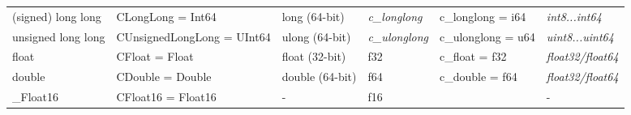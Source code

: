 \begin{table}[]
\begin{adjustwidth}{-3cm}{}
\begin{tabular}{
>{\columncolor[HTML]{D9D9D9}}l lllll}
(signed) long long                                                        & CLongLong = Int64                                                       &    long  (64-bit)                                                                        & \cellcolor[HTML]{CFE2F3}\textit{c\_longlong}                                 & c\_longlong = i64                                                                                                                                                    & \cellcolor[HTML]{CFE2F3}\textit{int8...int64}                         \\
unsigned long long                                                        & CUnsignedLongLong = UInt64                                              &    ulong (64-bit)                                                                               & \cellcolor[HTML]{CFE2F3}\textit{c\_ulonglong}                                & c\_ulonglong = u64                                                                                                                                                   & \cellcolor[HTML]{CFE2F3}\textit{uint8...uint64}                       \\
float                                                                     & CFloat = Float                                                          &    float (32-bit)                                                                                    & f32                                                                 & c\_float = f32                                                                                                                                                                & \cellcolor[HTML]{CFE2F3}\textit{float32/float64}                      \\
double                                                                    & CDouble = Double                                                        &    double (64-bit)                                                                       & f64                                                                 & c\_double = f64                                                                                                                                                               & \cellcolor[HTML]{CFE2F3}\textit{float32/float64}                      \\
\_Float16                                                                 & CFloat16 = Float16                                                      & \cellcolor[HTML]{F4CCCC}-                                                                                    & f16                                                                 & \cellcolor[HTML]{F4CCCC}{\href{https://doc.rust-lang.org/std/primitive.f16.html}{f16 (Exp.)}}                                                                                 & \cellcolor[HTML]{F4CCCC}-                                               \\

\end{tabular}
\end{adjustwidth}
\end{table}
